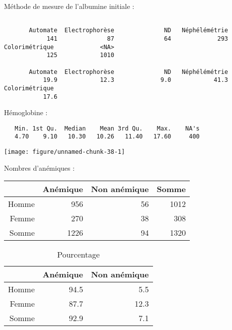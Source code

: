 \documentclass[11pt,a4paper]{article}\usepackage[]{graphicx}\usepackage[]{color}
\makeatletter
\def\maxwidth{ %
  \ifdim\Gin@nat@width>\linewidth
    \linewidth
  \else
    \Gin@nat@width
  \fi
}
\newenvironment{kframe}{%
 \def\at@end@of@kframe{}%
 \ifinner\ifhmode%
  \def\at@end@of@kframe{\end{minipage}}%
  \begin{minipage}{\columnwidth}%
 \fi\fi%
 \def\FrameCommand##1{\hskip\@totalleftmargin \hskip-\fboxsep
 \colorbox{shadecolor}{##1}\hskip-\fboxsep
     \hskip-\linewidth \hskip-\@totalleftmargin \hskip\columnwidth}%
 \MakeFramed {\advance\hsize-\width
   \@totalleftmargin\z@ \linewidth\hsize
   \@setminipage}}%
 {\par\unskip\endMakeFramed%
 \at@end@of@kframe}
\newenvironment{knitrout}{}{} %
\makeatother
\begin{document}
Méthode de mesure de l'albumine initiale :

\begin{knitrout}
\color{fgcolor}\begin{kframe}
\begin{verbatim}

       Automate  Electrophorèse              ND   Néphélémétrie 
            141              87              64             293 
Colorimétrique             <NA> 
            125            1010 

       Automate  Electrophorèse              ND   Néphélémétrie 
           19.9            12.3             9.0            41.3 
Colorimétrique  
           17.6 
\end{verbatim}
\end{kframe}
\end{knitrout}

Hémoglobine :

\begin{knitrout}
\color{fgcolor}\begin{kframe}
\begin{verbatim}
   Min. 1st Qu.  Median    Mean 3rd Qu.    Max.    NA's 
   4.70    9.10   10.30   10.26   11.40   17.60     400 
\end{verbatim}
\end{kframe}
\texttt{[image: figure/unnamed-chunk-38-1]} 

\end{knitrout}

Nombres d'anémiques :

\begin{table}[ht]
\centering
\begin{tabular}{rrrr}
  \hline
 & Anémique & Non anémique & Somme \\ 
  \hline
Homme & 956 & 56 & 1012 \\ 
  Femme & 270 & 38 & 308 \\ 
  Somme & 1226 & 94 & 1320 \\ 
   \hline
\end{tabular}
\end{table}
\begin{table}[ht]
\centering
\begin{tabular}{rrr}
  \hline
 & Anémique & Non anémique \\ 
  \hline
Homme & 94.5 & 5.5 \\ 
  Femme & 87.7 & 12.3 \\ 
  Somme & 92.9 & 7.1 \\ 
   \hline
\end{tabular}
\caption{Pourcentage} 
\end{table}
\end{document}
